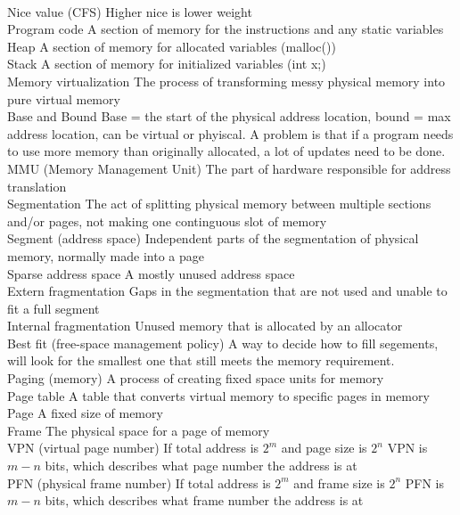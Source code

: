 \documentclass[6pt]{article}
\begin{document}
\\
Nice value (CFS)
Higher nice is lower weight
\\
Program code
A section of memory for the instructions and any static variables
\\
Heap
A section of memory for allocated variables (malloc())
\\
Stack
A section of memory for initialized variables (int x;)
\\
Memory virtualization
The process of transforming messy physical memory into pure virtual memory
\\
Base and Bound
Base = the start of the physical address location, bound = max address location, can be virtual or phyiscal. A problem is that if a program needs to use more memory than originally allocated, a lot of updates need to be done.
\\
MMU (Memory Management Unit)
The part of hardware responsible for address translation
\\
Segmentation
The act of splitting physical memory between multiple sections and/or pages, not making one continguous slot of memory
\\
Segment (address space)
Independent parts of the segmentation of physical memory, normally made into a page
\\
Sparse address space
A mostly unused address space
\\
Extern fragmentation
Gaps in the segmentation that are not used and unable to fit a full segment
\\
Internal fragmentation
Unused memory that is allocated by an allocator
\\
Best fit (free-space management policy)
A way to decide how to fill segements, will look for the smallest one that still meets the memory requirement.
\\
Paging (memory)
A process of creating fixed space units for memory
\\
Page table
A table that converts virtual memory to specific pages in memory
\\
Page
A fixed size of memory
\\
Frame
The physical space for a page of memory
\\
VPN (virtual page number)
If total address is $2^m$ and page size is $2^n$ VPN is $m-n$ bits, which describes what page number the address is at
\\
PFN (physical frame number)
If total address is $2^m$ and frame size is $2^n$ PFN is $m-n$ bits, which describes what frame number the address is at
\end{document}

